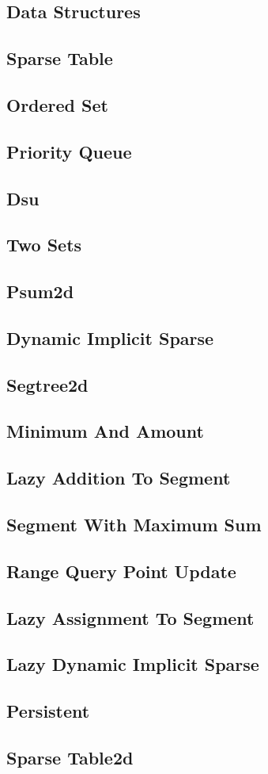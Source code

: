 \documentclass{article}
\newcommand\includes[2]{ %
   \subsection{#1}
   
}
\begin{document}
\begin{multicols}{2}
\section{Data Structures}
\includes{Sparse Table}{Code/Data Structures/sparse_table.cpp}
\includes{Ordered Set}{Code/Data Structures/ordered_set.cpp}
\includes{Priority Queue}{Code/Data Structures/priority_queue.cpp}
\includes{Dsu}{Code/Data Structures/dsu.cpp}
\includes{Two Sets}{Code/Data Structures/two_sets.cpp}
\includes{Psum2d}{Code/Data Structures/psum2D.cpp}
\includes{Dynamic Implicit Sparse}{Code/Data Structures/Segtree/dynamic_implicit_sparse.cpp}
\includes{Segtree2d}{Code/Data Structures/Segtree/segtree2D.cpp}
\includes{Minimum And Amount}{Code/Data Structures/Segtree/minimum_and_amount.cpp}
\includes{Lazy Addition To Segment}{Code/Data Structures/Segtree/lazy_addition_to_segment.cpp}
\includes{Segment With Maximum Sum}{Code/Data Structures/Segtree/segment_with_maximum_sum.cpp}
\includes{Range Query Point Update}{Code/Data Structures/Segtree/range_query_point_update.cpp}
\includes{Lazy Assignment To Segment}{Code/Data Structures/Segtree/lazy_assignment_to_segment.cpp}
\includes{Lazy Dynamic Implicit Sparse}{Code/Data Structures/Segtree/lazy_dynamic_implicit_sparse.cpp}
\includes{Persistent}{Code/Data Structures/Segtree/persistent.cpp}
\includes{Sparse Table2d}{Code/Data Structures/sparse_table2D.cpp}

\end{multicols}
\end{document}
